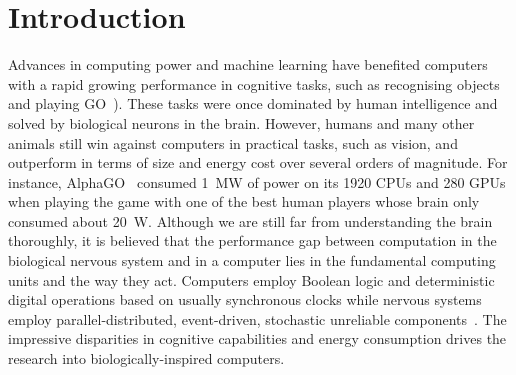 \chapter{Introduction}
\label{cha:intro}
Advances in computing power and machine learning have benefited computers with a rapid growing performance in cognitive tasks, such as recognising objects~\cite{deng2009imagenet} and playing GO~\cite{silver2016mastering}). 
These tasks were once dominated by human intelligence and solved by biological neurons in the brain.
However, humans and many other animals still win against computers in practical tasks, such as vision, and outperform in terms of size and energy cost over several orders of magnitude.
For instance, AlphaGO~\cite{silver2016mastering} consumed 1~MW of power on its 1920 CPUs and 280 GPUs when playing the game with one of the best human players whose brain only consumed about 20~W.
Although we are still far from understanding the brain thoroughly, it is believed that the performance gap between computation in the biological nervous system and in a computer lies in the fundamental computing units and the way they act.
Computers employ Boolean logic and deterministic digital operations based on usually synchronous clocks while nervous systems employ parallel-distributed, event-driven, stochastic unreliable components~\cite{indiveri2009artificial}.
The impressive disparities in cognitive capabilities and energy consumption drives the research into biologically-inspired computers.




